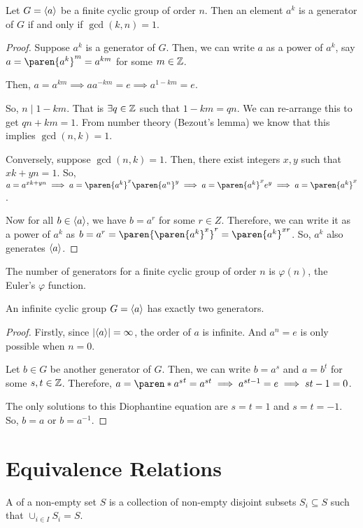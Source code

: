 \documentclass[11pt]{penrose}
\begin{document}
\begin{nthm}
    Let $G = \langle a\rangle$ be a finite cyclic group of order $n$. Then an element $a^k$ is a generator of $G$ if and only if $\gcd(k,n) = 1$.
\end{nthm}
\begin{proof}
    Suppose $a^k$ is a generator of $G$. Then, we can write $a$ as a power of $a^k$, say $a = \paren{a^k}^m = a^{km}$ for some $m \in \mathbb{Z}$.

    Then, $a = a^{km} \implies a a^{-km} = e \implies a^{1-km} = e$.

    So, $n \mid 1 - km$. That is $\exists q \in \mathbb{Z}$ such that $1 - km = qn$. We can re-arrange this to get $qn + km = 1$. From number theory (Bezout's lemma) we know that this implies $\gcd(n,k)=1$.

    Conversely, suppose $\gcd(n,k)=1$. Then, there exist integers $x, y$ such that $xk + yn = 1$. So, $a = a^{xk + yn} \implies a = \paren{a^{k}}^{x} \paren{a^{n}}^{y} \implies a = \paren{a^{k}}^{x} e^{y} \implies a = \paren{a^{k}}^{x}$.

    Now for all $b \in \langle a\rangle$, we have $b = a^r$ for some $r \in Z$. Therefore, we can write it as a power of $a^k$ as $b = a^r = \paren{\paren{a^{k}}^{x}}^{r} = \paren{a^{k}}^{xr}$. So, $a^k$ also generates $\langle a\rangle$.
\end{proof}

\begin{remark}
    The number of generators for a finite cyclic group of order $n$ is $\varphi(n)$, the Euler's $\varphi$ function.
\end{remark}

\begin{nthm}
    An infinite cyclic group $G = \langle a\rangle$ has exactly two generators.
\end{nthm}
\begin{proof}
    Firstly, since $|\langle a\rangle| = \infty$, the order of $a$ is infinite. And $a^n = e$ is only possible when $n = 0$.

    Let $b \in G$ be another generator of $G$. Then, we can write $b = a^s$ and $a = b^t$ for some $s, t \in \mathbb{Z}$. Therefore, $a = \paren*{a^{s}}^{t} = a^{st} \implies a^{st-1} = e \implies st-1 = 0$.
    
    The only solutions to this Diophantine equation are $s=t=1$ and $s=t=-1$. So, $b = a$ or $b = a^{-1}$.
\end{proof}

\section{Equivalence Relations}
\begin{ndfn}
    A  of a non-empty set $S$ is a collection of non-empty disjoint subsets $S_i \subseteq S$ such that $\cup_{i \in I} S_i = S$.
\end{ndfn}
\end{document}
